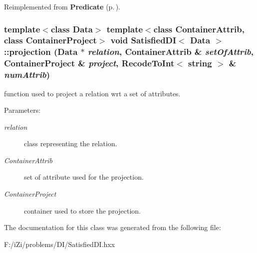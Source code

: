 Reimplemented from {\bf Predicate} {\rm (p.\,\pageref{class_predicate_6fb1a75dba2268f75738f335f403e46c})}.
\subsubsection{\setlength{\rightskip}{0pt plus 5cm}template$<$class Data$>$ template$<$class Container\-Attrib, class Container\-Project$>$ void {\bf Satisfied\-DI}$<$ Data $>$::projection (Data $\ast$ {\em relation}, Container\-Attrib \& {\em set\-Of\-Attrib}, Container\-Project \& {\em project}, {\bf Recode\-To\-Int}$<$ string $>$ \& {\em num\-Attrib})\hspace{0.3cm}{\tt  [protected]}}\label{class_satisfied_d_i_e30e2a55ae4c56e1a3cb744536b8cb07}


function used to project a relation wrt a set of attributes. 

\begin{Desc}
\item[Parameters:]
\begin{description}
\item[{\em relation}]class representing the relation. \item[{\em Container\-Attrib}]set of attribute used for the projection. \item[{\em Container\-Project}]container used to store the projection. \end{description}
\end{Desc}


The documentation for this class was generated from the following file:\begin{CompactItemize}
\item 
F:/i\-Zi/problems/DI/Satisfied\-DI.hxx\end{CompactItemize}
